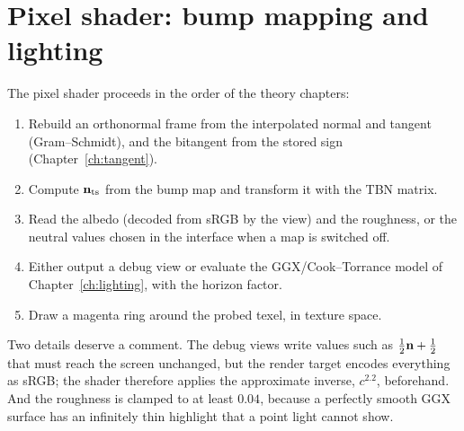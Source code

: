
\section{Pixel shader: bump mapping and lighting}
The pixel shader proceeds in the order of the theory chapters:
\begin{enumerate}
\item Rebuild an orthonormal frame from the interpolated normal and tangent (Gram--Schmidt), and
the bitangent from the stored sign (Chapter~\ref{ch:tangent}).
\item Compute $\mathbf{n}_{\mathrm{ts}}$ from the bump map and transform it with the TBN matrix.
\item Read the albedo (decoded from sRGB by the view) and the roughness, or the neutral values
chosen in the interface when a map is switched off.
\item Either output a debug view or evaluate the GGX/Cook--Torrance model of
Chapter~\ref{ch:lighting}, with the horizon factor.
\item Draw a magenta ring around the probed texel, in texture space.
\end{enumerate}


Two details deserve a comment. The debug views write values such as $\frac12\mathbf{n}+\frac12$
that must reach the screen unchanged, but the render target encodes everything as sRGB; the
shader therefore applies the approximate inverse, $c^{2.2}$, beforehand. And the roughness is
clamped to at least $0.04$, because a perfectly smooth GGX surface has an infinitely thin
highlight that a point light cannot show.
